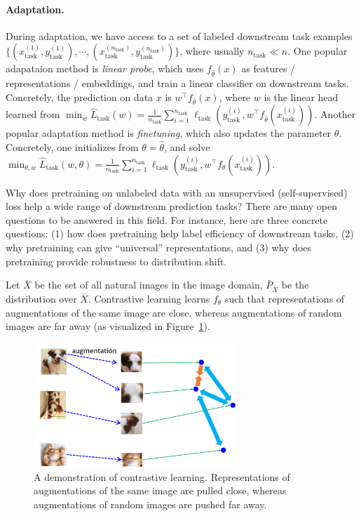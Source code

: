 \paragraph{Adaptation.} During adaptation, we have access to a set of labeled downstream task examples $\{(x^{(1)}_{\text{task}}, y^{(1)}_{\text{task}}), \cdots, (x^{(n_{\text{task}})}_{\text{task}}, y^{(n_{\text{task}})}_{\text{task}})\}$, where usually $n_{\text{task}}\ll n$. One popular adapataion method is \emph{linear probe}, which uses $f_{\hat{\theta}}(x)$ as features / representations / embeddings, and train a linear classifier on downstream tasks. Concretely, the prediction on data $x$ is $w^\top f_{\hat{\theta}}(x)$, where $w$ is the linear head learned from $\min_{w} \hat{L}_{\text{task}}(w) = \frac{1}{n_{\text{task}}} \sum_{i=1}^{n_{\text{task}}} \ell_{\text{task}}(y^{(i)}_{\text{task}}, w^\top f_{\hat{\theta}}(x^{(i)}_{\text{task}}))$. Another popular adaptation method is \emph{finetuning}, which also updates the parameter $\theta$. Concretely, one initializes from $\theta = \hat{\theta}$, and solve $\min_{\theta, w} \hat{L}_{\text{task}}(w, \theta) = \frac{1}{n_{\text{task}}} \sum_{i=1}^{n_{\text{task}}} \ell_{\text{task}}(y^{(i)}_{\text{task}}, w^\top f_{{\theta}}(x^{(i)}_{\text{task}}))$.

Why does pretraining on unlabeled data with an unsupervised (self-supervised) loss help a wide range of downstream prediction tasks? There are many open questions to be answered in this field. For instance, here are three concrete questions: (1) how does pretraining help label efficiency of downstream tasks, (2) why pretraining can give ``universal'' representations, and (3) why does pretraining provide robustness to distribution shift. 

\label{section:analysis_contrastive_learning}
Let $\bar{X}$ be the set of all natural images in the image domain, $\bar{P}_{\bar{X}}$ be the distribution over $\bar{X}$. Contrastive learning learns $f_{\theta}$ such that representations of augmentations of the same image are close, whereas augmentations of random images are far away (as visualized in Figure~\ref{fig:ssl2}). 

\begin{figure}[ht]
	\centering
	\includegraphics[width=3in]{figures/ssl5.pdf}
	\caption{A demonstration of contrastive learning. Representations of augmentations of the same image are pulled close, whereas augmentations of random images are pushed far away.}
	\label{fig:ssl2}
\end{figure}

